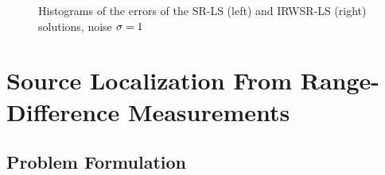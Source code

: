\begin{figure}%
\centering
\caption{Histograms of the errors of the SR-LS (left) and IRWSR-LS (right) solutions, noise $\protect\sigma = 1$}
\label{fig:Noise00IRW}
\end{figure}

\newpage

\section{Source Localization From Range-Difference Measurements}%
\subsection{Problem Formulation} %

